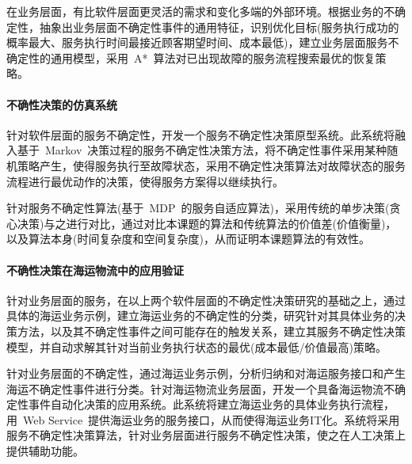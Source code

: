 在业务层面，有比软件层面更灵活的需求和变化多端的外部环境。根据业务的不确定性，抽象出业务层面不确定性事件的通用特征，识别优化目标(服务执行成功的概率最大、服务执行时间最接近顾客期望时间、成本最低)，建立业务层面服务不确定性的通用模型，采用~A*~算法对已出现故障的服务流程搜索最优的恢复策略。

\paragraph{不确性决策的仿真系统}

针对软件层面的服务不确定性，开发一个服务不确定性决策原型系统。此系统将融入基于~Markov~决策过程的服务不确定性决策方法，将不确定性事件采用某种随机策略产生，使得服务执行至故障状态，采用不确定性决策算法对故障状态的服务流程进行最优动作的决策，使得服务方案得以继续执行。

针对服务不确定性算法(基于~MDP~的服务自适应算法)，采用传统的单步决策(贪心决策)与之进行对比，通过对比本课题的算法和传统算法的价值差(价值衡量)，以及算法本身(时间复杂度和空间复杂度)，从而证明本课题算法的有效性。

\paragraph{不确性决策在海运物流中的应用验证}

针对业务层面的服务，在以上两个软件层面的不确定性决策研究的基础之上，通过具体的海运业务示例，建立海运业务的不确定性的分类，研究针对其具体业务的决策方法，以及其不确定性事件之间可能存在的触发关系，建立其服务不确定性决策模型，并自动求解其针对当前业务执行状态的最优(成本最低/价值最高)策略。


针对业务层面的不确定性，通过海运业务示例，分析归纳和对海运服务接口和产生海运不确定性事件进行分类。针对海运物流业务层面，开发一个具备海运物流不确定性事件自动化决策的应用系统。此系统将建立海运业务的具体业务执行流程，用~Web Service~提供海运业务的服务接口，从而使得海运业务IT化。系统将采用服务不确定性决策算法，针对业务层面进行服务不确定性决策，使之在人工决策上提供辅助功能。
